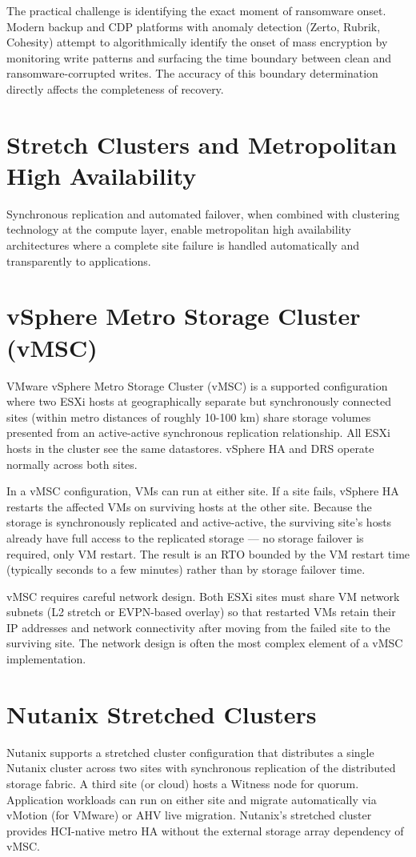 The practical challenge is identifying the exact moment of ransomware onset. Modern backup and CDP platforms with anomaly detection (Zerto, Rubrik, Cohesity) attempt to algorithmically identify the onset of mass encryption by monitoring write patterns and surfacing the time boundary between clean and ransomware-corrupted writes. The accuracy of this boundary determination directly affects the completeness of recovery.

\section{Stretch Clusters and Metropolitan High Availability}
Synchronous replication and automated failover, when combined with clustering technology at the compute layer, enable metropolitan high availability architectures where a complete site failure is handled automatically and transparently to applications.

\section{vSphere Metro Storage Cluster (vMSC)}
VMware vSphere Metro Storage Cluster (vMSC) is a supported configuration where two ESXi hosts at geographically separate but synchronously connected sites (within metro distances of roughly 10-100 km) share storage volumes presented from an active-active synchronous replication relationship. All ESXi hosts in the cluster see the same datastores. vSphere HA and DRS operate normally across both sites.

In a vMSC configuration, VMs can run at either site. If a site fails, vSphere HA restarts the affected VMs on surviving hosts at the other site. Because the storage is synchronously replicated and active-active, the surviving site's hosts already have full access to the replicated storage --- no storage failover is required, only VM restart. The result is an RTO bounded by the VM restart time (typically seconds to a few minutes) rather than by storage failover time.

vMSC requires careful network design. Both ESXi sites must share VM network subnets (L2 stretch or EVPN-based overlay) so that restarted VMs retain their IP addresses and network connectivity after moving from the failed site to the surviving site. The network design is often the most complex element of a vMSC implementation.

\section{Nutanix Stretched Clusters}
Nutanix supports a stretched cluster configuration that distributes a single Nutanix cluster across two sites with synchronous replication of the distributed storage fabric. A third site (or cloud) hosts a Witness node for quorum. Application workloads can run on either site and migrate automatically via vMotion (for VMware) or AHV live migration. Nutanix's stretched cluster provides HCI-native metro HA without the external storage array dependency of vMSC.

